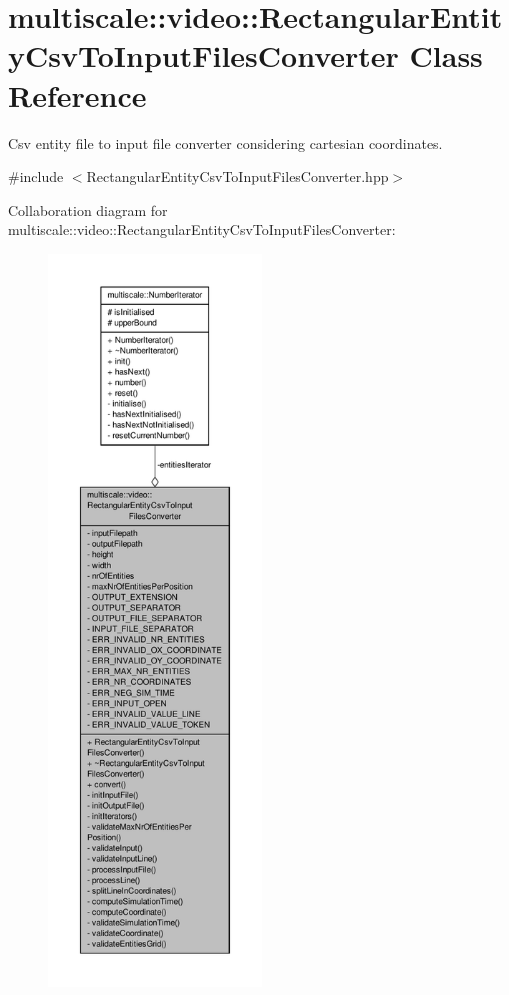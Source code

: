 \hypertarget{classmultiscale_1_1video_1_1RectangularEntityCsvToInputFilesConverter}{\section{multiscale\-:\-:video\-:\-:Rectangular\-Entity\-Csv\-To\-Input\-Files\-Converter Class Reference}
\label{classmultiscale_1_1video_1_1RectangularEntityCsvToInputFilesConverter}
}


Csv entity file to input file converter considering cartesian coordinates.  




{\ttfamily \#include $<$Rectangular\-Entity\-Csv\-To\-Input\-Files\-Converter.\-hpp$>$}



Collaboration diagram for multiscale\-:\-:video\-:\-:Rectangular\-Entity\-Csv\-To\-Input\-Files\-Converter\-:\nopagebreak
\begin{figure}[H]
\begin{center}
\leavevmode
\includegraphics[height=550pt]{classmultiscale_1_1video_1_1RectangularEntityCsvToInputFilesConverter__coll__graph}
\end{center}
\end{figure}
